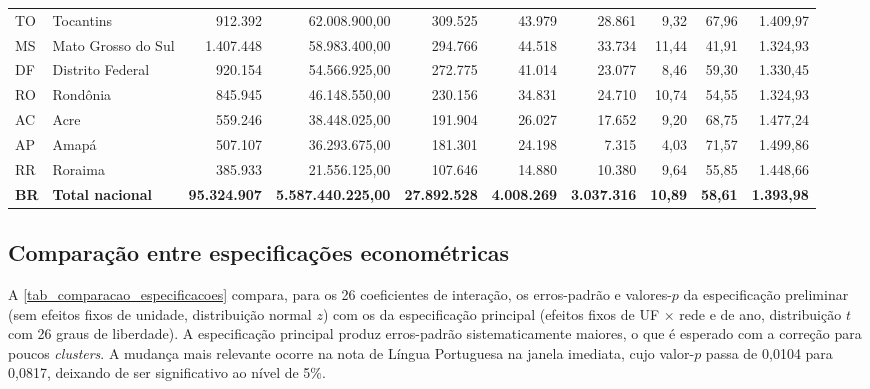 \begin{apendicesenv}
\begin{landscape}
{\begin{longtable}{llrrrrrrrr}
        TO & Tocantins           &    912.392 &  62.008.900,00 &   309.525 &  43.979 &  28.861 &  9,32 & 67,96 & 1.409,97 \\
        MS & Mato Grosso do Sul  &  1.407.448 &  58.983.400,00 &   294.766 &  44.518 &  33.734 & 11,44 & 41,91 & 1.324,93 \\
        DF & Distrito Federal    &    920.154 &  54.566.925,00 &   272.775 &  41.014 &  23.077 &  8,46 & 59,30 & 1.330,45 \\
        RO & Rondônia            &    845.945 &  46.148.550,00 &   230.156 &  34.831 &  24.710 & 10,74 & 54,55 & 1.324,93 \\
        AC & Acre                &    559.246 &  38.448.025,00 &   191.904 &  26.027 &  17.652 &  9,20 & 68,75 & 1.477,24 \\
        AP & Amapá               &    507.107 &  36.293.675,00 &   181.301 &  24.198 &   7.315 &  4,03 & 71,57 & 1.499,86 \\
        RR & Roraima             &    385.933 &  21.556.125,00 &   107.646 &  14.880 &  10.380 &  9,64 & 55,85 & 1.448,66 \\
        \midrule
        \textbf{BR} & \textbf{Total nacional} & \textbf{95.324.907} & \textbf{5.587.440.225,00} & \textbf{27.892.528} & \textbf{4.008.269} & \textbf{3.037.316} & \textbf{10,89} & \textbf{58,61} & \textbf{1.393,98} \\
    \end{longtable}
    }
    \end{landscape}


    \begin{landscape}
    \chapter{Comparação entre especificações econométricas}
    \label{chap_apendice_comparacao}

    A \autoref{tab_comparacao_especificacoes} compara, para os 26 coeficientes de interação, os erros-padrão e valores-$p$ da especificação preliminar (sem efeitos fixos de unidade, distribuição normal $z$) com os da especificação principal (efeitos fixos de UF $\times$ rede e de ano, distribuição $t$ com 26 graus de liberdade).
    A especificação principal produz erros-padrão sistematicamente maiores, o que é esperado com a correção para poucos \textit{clusters}.
    A mudança mais relevante ocorre na nota de Língua Portuguesa na janela imediata, cujo valor-$p$ passa de 0,0104 para 0,0817, deixando de ser significativo ao nível de 5\%.


\end{landscape}
\end{apendicesenv}
